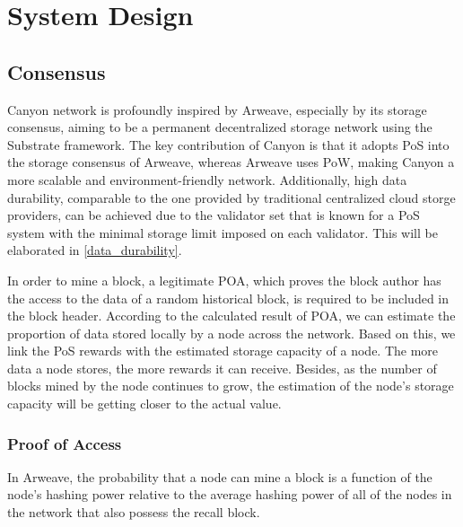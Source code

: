 \documentclass[]{article}
\begin{document}


\section{System Design}

\subsection{Consensus}

Canyon network is profoundly inspired by Arweave, especially by its storage consensus, aiming to be a permanent decentralized storage network using the Substrate framework. The key contribution of Canyon is that it adopts PoS into the storage consensus of Arweave, whereas Arweave uses PoW, making Canyon a more scalable and environment-friendly network. Additionally, high data durability, comparable to the one provided by traditional centralized cloud storge providers, can be achieved due to the validator set that is known for a PoS system with the minimal storage limit imposed on each validator. This will be elaborated in \ref{data_durability}.

In order to mine a block, a legitimate POA, which proves the block author has the access to the data of a random historical block, is required to be included in the block header. According to the calculated result of POA, we can estimate the proportion of data stored locally by a node across the network. Based on this, we link the PoS rewards with the estimated storage capacity of a node. The more data a node stores, the more rewards it can receive. Besides, as the number of blocks mined by the node continues to grow, the estimation of the node's storage capacity will be getting closer to the actual value.

\subsubsection{Proof of Access}

In Arweave, the probability that a node can mine a block is a function of the node’s hashing power relative to the average hashing power of all of the nodes in the network that also possess the recall block.
\end{document}
